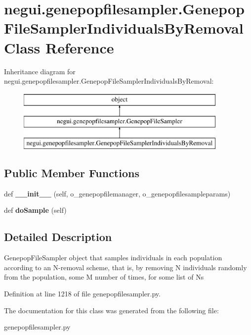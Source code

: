 \hypertarget{classnegui_1_1genepopfilesampler_1_1GenepopFileSamplerIndividualsByRemoval}{}\section{negui.\+genepopfilesampler.\+Genepop\+File\+Sampler\+Individuals\+By\+Removal Class Reference}
\label{classnegui_1_1genepopfilesampler_1_1GenepopFileSamplerIndividualsByRemoval}
Inheritance diagram for negui.\+genepopfilesampler.\+Genepop\+File\+Sampler\+Individuals\+By\+Removal\+:\begin{figure}[H]
\begin{center}
\leavevmode
\includegraphics[height=3.000000cm]{classnegui_1_1genepopfilesampler_1_1GenepopFileSamplerIndividualsByRemoval}
\end{center}
\end{figure}
\subsection*{Public Member Functions}
\begin{DoxyCompactItemize}
\item 
def {\bfseries \+\_\+\+\_\+init\+\_\+\+\_\+} (self, o\+\_\+genepopfilemanager, o\+\_\+genepopfilesampleparams)\hypertarget{classnegui_1_1genepopfilesampler_1_1GenepopFileSamplerIndividualsByRemoval_aeba1258d811dd266cb3378212a4a1926}{}\label{classnegui_1_1genepopfilesampler_1_1GenepopFileSamplerIndividualsByRemoval_aeba1258d811dd266cb3378212a4a1926}

\item 
def {\bfseries do\+Sample} (self)\hypertarget{classnegui_1_1genepopfilesampler_1_1GenepopFileSamplerIndividualsByRemoval_a89dd3d276b9f089ac4c46dd844e7a848}{}\label{classnegui_1_1genepopfilesampler_1_1GenepopFileSamplerIndividualsByRemoval_a89dd3d276b9f089ac4c46dd844e7a848}

\end{DoxyCompactItemize}


\subsection{Detailed Description}
\begin{DoxyVerb}GenepopFileSampler object that samples individuals in each population
according to an N-removal scheme, that is, by removing N individuals 
randomly from the population, some M number of times, for some list of Ns
\end{DoxyVerb}
 

Definition at line 1218 of file genepopfilesampler.\+py.



The documentation for this class was generated from the following file\+:\begin{DoxyCompactItemize}
\item 
genepopfilesampler.\+py\end{DoxyCompactItemize}

